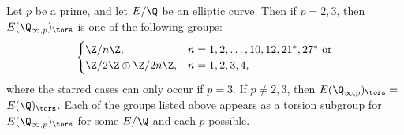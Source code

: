 \begin{frame}[plain]
\footnotesize
\begin{thm}
Let $p$ be a prime, and let $E/\Q$ be an elliptic curve. Then if $p= 2, 3$, then $E(\Q_{\infty, p})_\tors$ is one of the following groups:
	\[
	\begin{cases}
	\Z/n\Z, & n= 1, 2, \ldots, 10, 12, 21^*, 27^* \text{ or} \\
	\Z/2\Z \oplus \Z/2n\Z, & n= 1, 2, 3, 4, \\
	\end{cases}
	\]
where the starred cases can only occur if $p= 3$. If $p \neq 2, 3$, then $E(\Q_{\infty, p})_\tors=$ $E(\Q)_\tors$. Each of the groups listed above appears as a torsion subgroup for $E(\Q_{\infty,p})_\tors$ for some $E/\Q$ and each $p$ possible.
\end{thm}


\end{frame}
